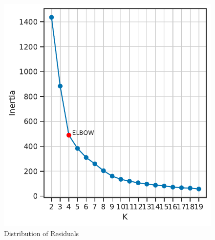 \documentclass[11pt,a4paper]{article}
\begin{document}
\begin{figure} [h!]
  \centering
  \includegraphics{report/k_screeplot.pdf}
  \caption{Distribution of Residuals}
  \label{fds-project-template:fig:k_screeplot}
\end{figure} \\ \\ 
\end{document}
